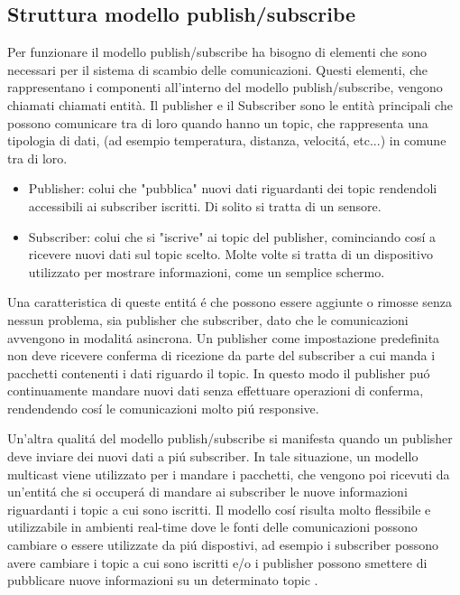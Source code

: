 \subsection{Struttura modello publish/subscribe}
Per funzionare il modello publish/subscribe ha bisogno di
elementi che sono necessari per il sistema di scambio delle 
comunicazioni. 
Questi elementi, che rappresentano i componenti all'interno
del modello publish/subscribe, vengono chiamati chiamati entità.
Il publisher e il Subscriber sono le entità principali
che possono comunicare tra di loro quando hanno un topic, che
rappresenta una tipologia di dati, (ad esempio temperatura, 
distanza, velocitá, etc...) in comune tra di loro.
\begin{itemize}
    \item Publisher: colui che "pubblica" nuovi dati riguardanti dei
    topic rendendoli accessibili ai subscriber iscritti. 
    Di solito si tratta di un sensore.
    \item Subscriber: colui che si "iscrive" ai topic del publisher, 
    cominciando
    cosí a ricevere nuovi dati sul topic scelto. Molte volte si tratta
    di un dispositivo utilizzato per mostrare informazioni, come un
    semplice schermo.
\end{itemize}
Una caratteristica di queste entitá é che possono essere aggiunte o rimosse
senza nessun problema, sia publisher che subscriber, dato che le 
comunicazioni avvengono in modalitá asincrona. Un publisher come impostazione
predefinita non deve ricevere conferma di ricezione da parte del 
subscriber a cui manda i pacchetti contenenti i dati riguardo il topic.
In questo modo il publisher puó continuamente mandare nuovi dati
senza effettuare operazioni di conferma, rendendendo cosí le comunicazioni
molto piú responsive. 

Un'altra qualitá del modello
publish/subscribe si manifesta quando
un publisher deve inviare dei nuovi dati a piú subscriber. 
In tale situazione, un
modello multicast viene utilizzato per i mandare i pacchetti, che vengono 
poi ricevuti da un'entitá che si occuperá di mandare ai subscriber
le nuove informazioni riguardanti i topic a cui sono iscritti.
Il modello cosí risulta molto
flessibile e utilizzabile in ambienti real-time dove le fonti delle
comunicazioni possono cambiare o essere utilizzate da piú dispostivi,
ad esempio i subscriber possono avere cambiare i topic a cui 
sono iscritti e/o i publisher possono smettere di pubblicare nuove
informazioni su un determinato topic \cite{OH2010318}.

